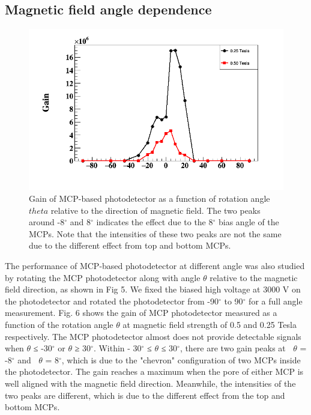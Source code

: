 \documentclass[preprint,5p]{elsarticle}
\begin{document}
\subsection{Magnetic field angle dependence}\label{subsec_theta}

\begin{figure}[tbp]
\centering 
\includegraphics[scale=0.35]{fig/MCPs_gain_theta_B.png}
\caption{Gain of MCP-based photodetector as a function of rotation angle $theta$ relative to the direction of magnetic field. The two peaks around -8$^{\circ}$ and 8$^{\circ}$ indicates the effect due to the 8$^{\circ}$ bias angle of the MCPs. Note that the intensities of these two peaks are not the same due to the different effect from top and bottom MCPs.} 
\label{fig:MCPs_gain_theta_B}
\end{figure}
The performance of MCP-based photodetector at different angle was also studied by rotating the MCP photodetector along with angle $\theta$ relative to the magnetic field direction, as shown in Fig 5. We fixed the biased high voltage at 3000 V on the photodetector and rotated the photodetector from -90$^{\circ}$ to 90$^{\circ}$ for a full angle measurement. Fig. 6 shows the gain of MCP photodetector measured as a function of the rotation angle $\theta$ at magnetic field strength of 0.5 and 0.25 Tesla respectively. The MCP photodetector almost does not provide detectable signals when $\theta$ ≤ -30$^{\circ}$ or $\theta$ ≥ 30$^{\circ}$. Within - 30$^{\circ}$ ≤ $\theta$ ≤ 30$^{\circ}$, there are two gain peaks at $~$ $\theta$ = -8$^{\circ}$ and $~$ $\theta$ = 8$^{\circ}$, which is due to the "chevron" configuration of two MCPs inside the photodetector. The gain reaches a maximum when the pore of either MCP is well aligned with the magnetic field direction. Meanwhile, the intensities of the two peaks are different, which is due to the different effect from the top and bottom MCPs.
\end{document}
